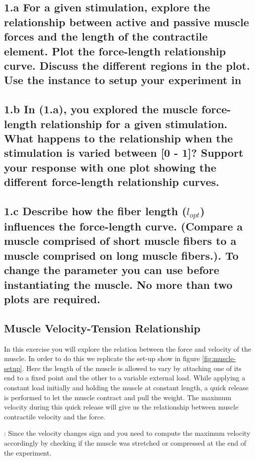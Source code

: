 \documentclass{cmc}
\begin{document}
\subsection*{1.a For a given stimulation, explore the relationship
  between active and passive muscle forces and the length of the
  contractile element.  Plot the force-length relationship curve.
  Discuss the different regions in the plot. Use the
  instance to setup your experiment in }

\subsection*{1.b In (1.a), you explored the muscle force-length
  relationship for a given stimulation. What happens to the
  relationship when the stimulation is varied between [0 - 1]? Support
  your response with one plot showing the different force-length
  relationship curves.}


\subsection*{1.c Describe how the fiber length ($l_{opt}$) influences
  the force-length curve.  (Compare a muscle comprised of short muscle
  fibers to a muscle comprised on long muscle fibers.). To change the
  parameter you can use
   before
  instantiating the muscle. No more than two plots are required. }


\subsection*{Muscle Velocity-Tension Relationship}
In this exercise you will explore the relation between the force and
velocity of the muscle. In order to do this we replicate the set-up
show in figure \ref{fig:muscle-setup}. Here the length of the muscle
is allowed to vary by attaching one of its end to a fixed point and
the other to a variable external load. While applying a constant load
initially and holding the muscle at constant length, a quick release
is performed to let the muscle contract and pull the weight. The
maximum velocity during this quick release will give us the
relationship between muscle contractile velocity and the force.


 : Since the velocity changes sign and you need to compute
the maximum velocity accordingly by checking if the muscle was
stretched or compressed at the end of the experiment.
\end{document}

